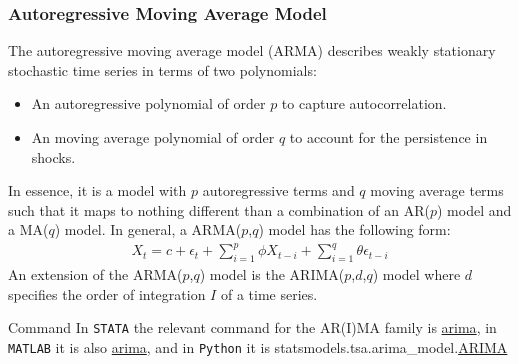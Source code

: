 \documentclass[xcolor=dvipsnames, english, 8pt]{beamer}
\begin{document}
\begin{frame}
    \frametitle{Autoregressive Moving Average Model}
The autoregressive moving average model (ARMA) describes weakly stationary stochastic time series in terms of two polynomials:\vspace{0.25cm}\\
\begin{itemize}
    \item An autoregressive polynomial of order $p$ to capture autocorrelation.
    \item An moving average polynomial of order $q$ to account for the persistence in shocks.\vspace{0.25cm}\\
\end{itemize}
In essence, it is a model with $p$ autoregressive terms and $q$ moving average terms such that it maps to nothing different than a combination of an AR($p$) model and a MA($q$) model. In general, a  ARMA($p$,$q$) model has the following form:
\begin{align}
    X_t = c + \epsilon_t +  \sum\limits_{i=1}^p\phi X_{t-i} +  \sum\limits_{i=1}^q\theta \epsilon_{t-i}
\end{align}
An extension of the ARMA($p$,$q$) model is the ARIMA($p$,$d$,$q$) model where $d$ specifies the order of integration $I$ of a time series.
\vfill
\begin{exampleblock}{{\small{Command}}}
In  \texttt{STATA} the relevant command for the AR(I)MA family is \href{https://www.stata.com/manuals13/tsarima.pdf}{\color{Purple}arima}, in \texttt{MATLAB} it is also \href{https://ch.mathworks.com/help/econ/arima.html;jsessionid=8072254506805dd340ee28abd6fb}{\color{Purple}arima}, and in \texttt{Python} it is statsmodels.tsa.arima\_model.\href{https://www.statsmodels.org/stable/generated/statsmodels.tsa.arima_model.ARIMA.html}{\color{Purple}ARIMA}
\end{exampleblock}
\end{frame}
\end{document}
